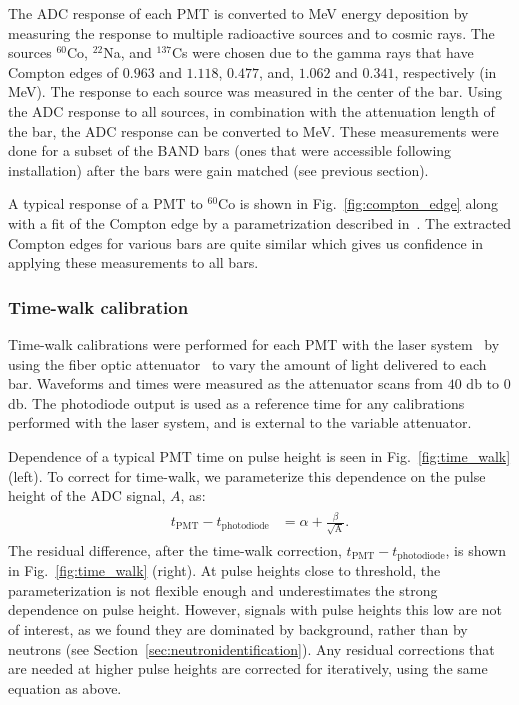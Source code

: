 \documentclass[review,number,sort&compress]{elsarticle}
\begin{document}
The ADC response of each PMT is converted to \si{\mega\electronvolt}
energy deposition by measuring the response to multiple radioactive
sources and to cosmic rays. The sources $^{60}$Co, $^{22}$Na, and $^{137}$Cs were chosen due
to the gamma rays that have Compton edges of $0.963$ and $1.118$,
$0.477$, and, $1.062$ and $0.341$, respectively (in
\si{\mega\electronvolt}). The response to each source was measured in
the center of the bar. Using the ADC response to all sources, in
combination with the attenuation length of the bar, the ADC response
can be converted to \si{\mega\electronvolt}. These measurements were
done for a subset of the BAND bars (ones that were accessible following
installation) after the bars were gain matched (see previous section).

A typical response of a PMT to $^{60}$Co is shown in
Fig.~\ref{fig:compton_edge} along with a fit of the Compton edge by a
parametrization described in~\cite{comptonedge}. The extracted Compton edges
for various bars are quite similar which gives us confidence in
applying these measurements to all bars. 

\subsubsection{Time-walk calibration}
Time-walk calibrations were performed for each PMT with the laser system~\cite{band-laser} by using the fiber optic attenuator~\cite{attenuator} to vary
the amount of light delivered to each bar. Waveforms and times were measured as the attenuator scans from $40$ \si{\decibel} to $0$ 
\si{\decibel}. The photodiode output is used as a reference time for any calibrations 
performed with the laser system, and is external to the variable attenuator.

Dependence of a typical PMT time on pulse height is seen in
Fig.~\ref{fig:time_walk} (left). To correct for time-walk, we
parameterize this dependence on the pulse height of the ADC signal, $A$,
as:
\begin{eqnarray}
	\begin{split}
		t_{\mathrm{PMT}}-t_{\mathrm{photodiode}}	&= \alpha + \frac{\beta}{\sqrt{\textrm{A}}}.				
		\label{eqn:time_walk}
	\end{split}
\end{eqnarray}
The residual difference, after the time-walk correction,
$t_{\mathrm{PMT}}-t_{\mathrm{photodiode}}$, is shown in
Fig.~\ref{fig:time_walk} (right). At pulse heights close to threshold,
the parameterization is not flexible enough and underestimates the
strong dependence on pulse height. However, signals with pulse heights
this low are not of interest, as we found they are dominated by background,
rather than by neutrons (see Section~\ref{sec:neutronidentification}). Any residual corrections that are needed at higher pulse heights are corrected for iteratively, using the same equation as above. 
\end{document}
